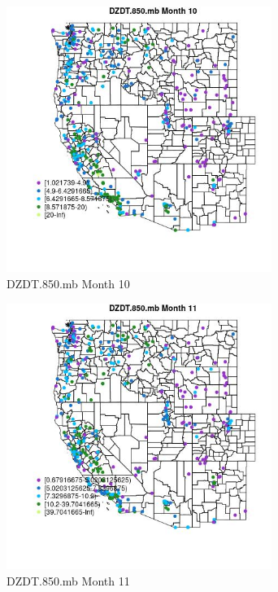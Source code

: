 \begin{figure} 
\centering  
\includegraphics[width=0.77\textwidth]{Code_Outputs/ML_input_report_ML_input_PM25_Step5_part_d_de_duplicated_aves_ML_input_MapObsMo10DZDT850mb.jpg} 
\caption{\label{fig:ML_input_report_ML_input_PM25_Step5_part_d_de_duplicated_aves_ML_inputMapObsMo10DZDT850mb}DZDT.850.mb Month 10} 
\end{figure} 
 

\begin{figure} 
\centering  
\includegraphics[width=0.77\textwidth]{Code_Outputs/ML_input_report_ML_input_PM25_Step5_part_d_de_duplicated_aves_ML_input_MapObsMo11DZDT850mb.jpg} 
\caption{\label{fig:ML_input_report_ML_input_PM25_Step5_part_d_de_duplicated_aves_ML_inputMapObsMo11DZDT850mb}DZDT.850.mb Month 11} 
\end{figure} 
 

